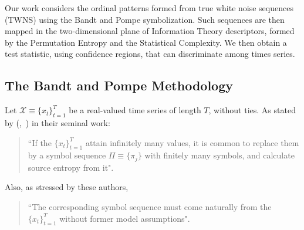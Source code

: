 \documentclass[alpha-refs]{wiley-article}
\newcommand{\Mycite}[1]{%
(\citeauthor{#1},~\citeyear{#1})}
\begin{document}
Our work considers the ordinal patterns formed from true white noise sequences (TWNS) using the Bandt and Pompe symbolization.
Such sequences are then mapped in the two-dimensional plane of Information Theory descriptors, formed by the Permutation Entropy and the Statistical Complexity.
We then obtain a test statistic, using confidence regions, that can discriminate among times series.

\subsection{The Bandt and Pompe Methodology}\label{Sec:BPMethodology}

Let ${\mathcal X} \equiv \{x_t\}_{t=1}^{T}$ be a real-valued time series of length $T$, without ties. 
As stated by \Mycite{PermutationEntropyBandtPompe} in their seminal work:  
\begin{quote}
	``If the $\{x_t\}_{t=1}^{T}$ attain infinitely many values, it is common to replace them by a symbol sequence 
	$\Pi \equiv \{\pi_j\}$ with finitely many symbols, and calculate source entropy from it".
\end{quote}
Also, as stressed by these authors, 
\begin{quote}
	``The corresponding symbol sequence must come 
	naturally from the $\{x_t\}_{t=1}^{T}$ without former model assumptions".
\end{quote}
\end{document}
